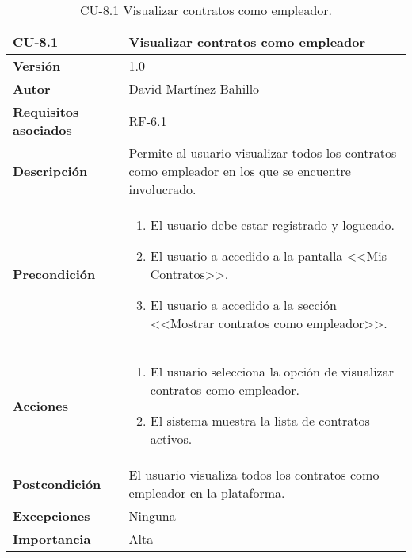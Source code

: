 \begin{table}[p]
	\centering
	\begin{tabularx}{\linewidth}{ p{} p{} }
		\toprule
		\textbf{CU-8.1}  & \textbf{Visualizar contratos como empleador}\\
		\midrule
		\textbf{Versión}              & 1.0    \\
		\textbf{Autor}                & David Martínez Bahillo \\
		\textbf{Requisitos asociados} & RF-6.1 \\
		\textbf{Descripción}          & Permite al usuario visualizar todos los contratos como empleador en los que se encuentre involucrado. \\
		\textbf{Precondición}         &  
		\begin{enumerate}
			\def\labelenumi{\arabic{enumi}.}
			\tightlist
			\item El usuario debe estar registrado y logueado.
			\item El usuario a accedido a la pantalla <<Mis Contratos>>.
			\item El usuario a accedido a la sección <<Mostrar contratos como empleador>>.
		\end{enumerate}\\
		\textbf{Acciones}             &
		\begin{enumerate}
			\def\labelenumi{\arabic{enumi}.}
			\tightlist
			\item El usuario selecciona la opción de visualizar contratos como empleador.
			\item El sistema muestra la lista de contratos activos.
		\end{enumerate}\\
		\textbf{Postcondición}        & El usuario visualiza todos los contratos como empleador en la plataforma. \\
		\textbf{Excepciones}          & Ninguna \\
		\textbf{Importancia}          & Alta \\
		\bottomrule
	\end{tabularx}
	\caption{CU-8.1 Visualizar contratos como empleador.}
\end{table}


